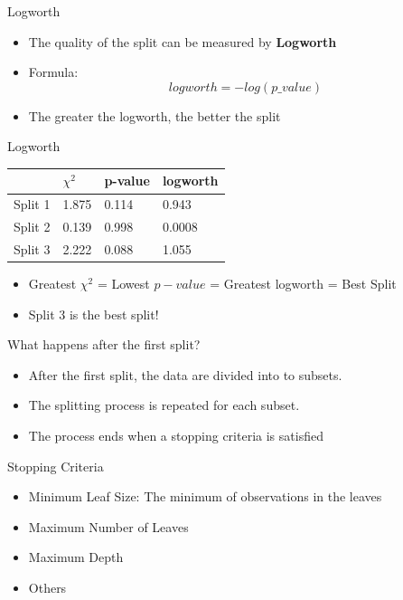 \documentclass[
  ignorenonframetext,
]{beamer}
\providecommand{\tightlist}{%
  \setlength{\itemsep}{0pt}\setlength{\parskip}{0pt}}
\begin{document}
\begin{frame}{Logworth}
\protect\hypertarget{logworth}{}
\begin{itemize}
\tightlist
\item
  The quality of the split can be measured by \textbf{Logworth}
\item
  Formula: \[logworth = -log(p\text{_}value)\]
\item
  The greater the logworth, the better the split
\end{itemize}
\end{frame}

\begin{frame}{Logworth}
\protect\hypertarget{logworth-1}{}
\begin{longtable}[]{@{}llll@{}}
\toprule
& \(\chi^2\) & p-value & logworth \\
\midrule
\endhead
Split 1 & 1.875 & 0.114 & 0.943 \\
Split 2 & 0.139 & 0.998 & 0.0008 \\
Split 3 & 2.222 & 0.088 & 1.055 \\
\bottomrule
\end{longtable}

\begin{itemize}
\item
  Greatest \(\chi^2\) = Lowest \(p-value\) = Greatest logworth = Best
  Split
\item
  Split 3 is the best split!
\end{itemize}
\end{frame}

\begin{frame}{What happens after the first split?}
\protect\hypertarget{what-happens-after-the-first-split}{}
\begin{itemize}
\tightlist
\item
  After the first split, the data are divided into to subsets.
\item
  The splitting process is repeated for each subset.
\item
  The process ends when a stopping criteria is satisfied
\end{itemize}
\end{frame}

\begin{frame}{Stopping Criteria}
\protect\hypertarget{stopping-criteria}{}
\begin{itemize}
\tightlist
\item
  Minimum Leaf Size: The minimum of observations in the leaves
\item
  Maximum Number of Leaves
\item
  Maximum Depth
\item
  Others
\end{itemize}
\end{frame}
\end{document}
